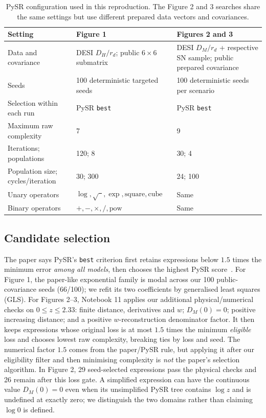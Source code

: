 \documentclass[11pt]{article}
\begin{document}
\begin{table}[htbp]
\centering\small
\caption{PySR configuration used in this reproduction. The Figure 2 and 3 searches share the same settings but use different prepared data vectors and covariances.}
\label{tab:pysr}
\begin{tabular}{@{}p{4.2cm}p{5.0cm}p{5.0cm}@{}}
\toprule
Setting & Figure 1 & Figures 2 and 3\\
\midrule
Data and covariance & DESI $D_H/r_d$; public $6\times6$ submatrix & DESI $D_M/r_d$ + respective SN sample; public prepared covariance\\
Seeds & 100 deterministic targeted seeds & 100 deterministic seeds per scenario\\
Selection within each run & PySR \texttt{best} & PySR \texttt{best}\\
Maximum raw complexity & 7 & 9\\
Iterations; populations & 120; 8 & 30; 4\\
Population size; cycles/iteration & 30; 300 & 24; 100\\
Unary operators & $\log,\sqrt{\phantom z},\exp,\mathrm{square},\mathrm{cube}$ & Same\\
Binary operators & $+,-,\times,/,\mathrm{pow}$ & Same\\
\bottomrule
\end{tabular}
\end{table}

\subsection{Candidate selection}
The paper says PySR's \texttt{best} criterion first retains expressions below $1.5$ times the minimum error \emph{among all models}, then chooses the highest PySR score~\cite{SousaNeto2025}. For Figure 1, the paper-like exponential family is modal across our 100 public-covariance seeds (66/100); we refit its two coefficients by generalised least squares (GLS). For Figures 2--3, Notebook 11 applies our additional physical/numerical checks on $0\leq z\leq2.33$: finite distance, derivatives and $w$; $D_M(0)=0$; positive increasing distance; and a positive $w$-reconstruction denominator factor. It then keeps expressions whose original loss is at most $1.5$ times the minimum \emph{eligible} loss and chooses lowest raw complexity, breaking ties by loss and seed. The numerical factor $1.5$ comes from the paper/PySR rule, but applying it after our eligibility filter and then minimising complexity is \emph{not} the paper's selection algorithm. In Figure 2, 29 seed-selected expressions pass the physical checks and 26 remain after this loss gate. A simplified expression can have the continuous value $D_M(0)=0$ even when its unsimplified PySR tree contains $\log z$ and is undefined at exactly zero; we distinguish the two domains rather than claiming $\log 0$ is defined.
\end{document}
